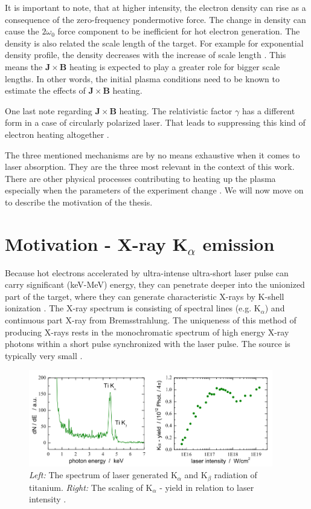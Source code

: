 It is important to note, that at higher intensity, the electron density can rise as a consequence of the zero-frequency pondermotive force. The change in density can cause the $2\omega_0$ force component to be inefficient for hot electron generation. The density is also related the scale length of the target. For example for exponential density profile, the density decreases with the increase of scale length \cite{cai2006}. This means the $\bm{J}\times \bm{B}$ heating is expected to play a greater role for bigger scale lengths. In other words, the initial plasma conditions need to be known to estimate the effects of $\bm{J}\times \bm{B}$ heating.

One last note regarding $\bm{J}\times \bm{B}$ heating. The relativistic factor $\gamma$ has a different form in a case of circularly polarized laser. That leads to suppressing this kind of electron heating altogether \cite{cai2006}.


The three mentioned mechanisms are by no means exhaustive when it comes to laser absorption. They are the three most relevant in the context of this work. There are other physical processes contributing to heating up the plasma especially when the parameters of the experiment change \cite{absorption1}. We will now move on to describe the motivation of the thesis.

\section{Motivation - X-ray $\mathbf{K}_\alpha$ emission}
Because hot electrons accelerated by ultra-intense ultra-short laser pulse can carry significant (keV-MeV) energy, they can penetrate deeper into the unionized part of the target, where they can generate characteristic X-rays by K-shell ionization \cite{reich2000}. The X-ray spectrum is consisting of spectral lines (e.g. $\mathrm{K}_\alpha$) and continuous part X-ray from Bremsstrahlung. The uniqueness of this method of producing X-rays rests in the monochromatic spectrum of high energy X-ray photons within a short pulse synchronized with the laser pulse. The source is typically very small \cite{pfeifer2006}.

\begin{figure}[h]
	\centering
	\includegraphics[width=0.95\textwidth]{figures/spectrum-ti}
	\caption{\textit{Left:} The spectrum of laser generated $\mathrm{K}_\alpha$ and $\mathrm{K}_\beta$ radiation of titanium. \textit{Right:} The scaling of $\mathrm{K}_\alpha$ - yield in relation to laser intensity \cite{schwoerer2004}.}
	\label{fig:ti-spectrum}
\end{figure}

